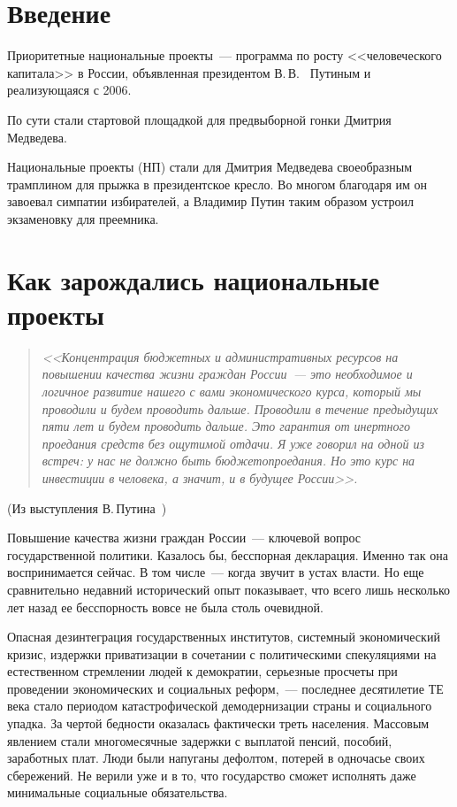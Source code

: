 \documentclass[article, 12pt, russian, oneside]{ncc}
\begin{document}
 \thispagestyle{empty}
\tableofcontents
\newpage

\section*{Введение}

Приоритетные национальные проекты~--- программа по росту <<человеческого капитала>> в России, объявленная президентом В.\,В.~ Путиным и реализующаяся с 2006.

По сути стали стартовой площадкой для предвыборной гонки Дмитрия Медведева.

Национальные проекты (НП) стали для Дмитрия Медведева своеобразным трамплином для прыжка в президентское кресло. Во многом благодаря им он завоевал симпатии избирателей, а Владимир Путин таким образом устроил экзаменовку для преемника.
\newpage

\section{Как зарождались национальные проекты}

\begin{quote}
  \emph{<<Концентрация бюджетных и административных ресурсов на
    повышении качества жизни граждан России~--- это необходимое и
    логичное развитие нашего с вами экономического курса, который мы
    проводили и будем проводить дальше. Проводили в течение предыдущих
    пяти лет и будем проводить дальше. Это гарантия от инертного
    проедания средств без ощутимой отдачи. Я уже говорил на одной из
    встреч: у нас не должно быть бюджетопроедания. Но это курс на
    инвестиции в человека, а значит, и в будущее России>>.}
\end{quote}
\begin{flushright}
  (Из выступления В.\,Путина~\cite{Putin_RG})
\end{flushright}

Повышение качества жизни граждан России~--- ключевой вопрос
государственной политики. Казалось бы, бесспорная декларация. Именно
так она воспринимается сейчас. В том числе~--- когда звучит в устах
власти. Но еще сравнительно недавний исторический опыт показывает, что
всего лишь несколько лет назад ее бесспорность вовсе не была столь
очевидной.

Опасная дезинтеграция государственных институтов, системный
экономический кризис, издержки приватизации в сочетании с
политическими спекуляциями на естественном стремлении людей к
демократии, серьезные просчеты при проведении экономических и
социальных реформ,~--- последнее десятилетие ТЕ века стало периодом
катастрофической демодернизации страны и социального упадка. За чертой
бедности оказалась фактически треть населения. Массовым явлением стали
многомесячные задержки с выплатой пенсий, пособий, заработных
плат. Люди были напуганы дефолтом, потерей в одночасье своих
сбережений. Не верили уже и в то, что государство сможет исполнять
даже минимальные социальные обязательства.
\end{document}
